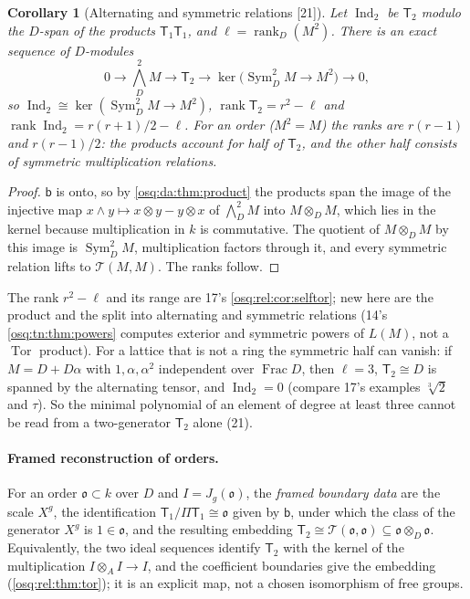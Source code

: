 \documentclass[11pt,letterpaper]{article}
\numberwithin{equation}{section}
\newtheorem{corollary}[corollary]{Corollary}
\theoremstyle{definition}
\theoremstyle{remark}
\theoremstyle{plain}
\newcommand{\Frac}{\operatorname{Frac}}
\newcommand{\Tor}{\operatorname{Tor}}
\newcommand{\rk}{\operatorname{rank}}
\newcommand{\src}[1]{\textup{\textsf{[#1]}}}
\begin{document}
\begin{corollary}[Alternating and symmetric relations \src{21}]\label{osq:da:cor:indecomposable}
Let $\operatorname{Ind}_2$ be $\mathsf T_2$ modulo the $D$-span of the products $\mathsf T_1\mathsf T_1$, and $\ell=\rk_D(M^2)$. There is an exact
sequence of $D$-modules
\[
 0\longrightarrow\textstyle\bigwedge^2_DM\longrightarrow\mathsf T_2\longrightarrow\ker\bigl(\operatorname{Sym}^2_DM\to M^2\bigr)\longrightarrow0,
\]
so $\operatorname{Ind}_2\cong\ker(\operatorname{Sym}^2_DM\to M^2)$, $\rk\mathsf T_2=r^2-\ell$ and $\rk\operatorname{Ind}_2=r(r+1)/2-\ell$. For an
order ($M^2=M$) the ranks are $r(r-1)$ and $r(r-1)/2$: the products account for half of $\mathsf T_2$, and the other half consists of
symmetric multiplication relations.
\end{corollary}
\begin{proof}
$\mathsf b$ is onto, so by \cref{osq:da:thm:product} the products span the image of the injective map $x\wedge y\mapsto x\otimes y-y\otimes x$
of $\bigwedge^2_DM$ into $M\otimes_DM$, which lies in the kernel because multiplication in $k$ is commutative. The quotient of $M\otimes_DM$ by this image is
$\operatorname{Sym}^2_DM$, multiplication factors through it, and every symmetric relation lifts to $\mathcal T(M,M)$. The ranks follow.
\end{proof}

The rank $r^2-\ell$ and its range are 17's \cref{osq:rel:cor:selftor}; new here are the product and the split into alternating and symmetric
relations (14's \cref{osq:tn:thm:powers} computes exterior and symmetric powers of $L(M)$, not a $\Tor$ product). For a lattice that is not a
ring the symmetric half can vanish: if $M=D+D\alpha$ with $1,\alpha,\alpha^2$ independent over $\Frac D$, then $\ell=3$,
$\mathsf T_2\cong D$ is spanned by the alternating tensor, and $\operatorname{Ind}_2=0$ (compare 17's examples $\sqrt[3]2$ and $\tau$). So the
minimal polynomial of an element of degree at least three cannot be read from a two-generator $\mathsf T_2$ alone (21).

\paragraph{Framed reconstruction of orders.} For an order $\mathfrak o\subset k$ over $D$ and $I=J_g(\mathfrak o)$, the \emph{framed boundary
data} are the scale $X^g$, the identification $\mathsf T_1/\Pi\mathsf T_1\cong\mathfrak o$ given by $\mathsf b$, under which the class of the
generator $X^g$ is $1\in\mathfrak o$, and the resulting embedding $\mathsf T_2\cong\mathcal T(\mathfrak o,\mathfrak o)\subseteq\mathfrak o\otimes_D\mathfrak o$.
Equivalently, the two ideal sequences identify $\mathsf T_2$ with the kernel of the multiplication $I\otimes_AI\to I$, and the coefficient
boundaries give the embedding (\cref{osq:rel:thm:tor}); it is an explicit map, not a chosen isomorphism of free groups.
\end{document}
